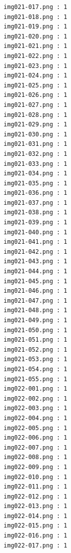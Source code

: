 \documentclass[12pt,a4paper]{article}
\begin{document}
\begin{lstlisting}
                     img021-017.png : 1
                     img021-018.png : 1
                     img021-019.png : 1
                     img021-020.png : 1
                     img021-021.png : 1
                     img021-022.png : 1
                     img021-023.png : 1
                     img021-024.png : 1
                     img021-025.png : 1
                     img021-026.png : 1
                     img021-027.png : 1
                     img021-028.png : 1
                     img021-029.png : 1
                     img021-030.png : 1
                     img021-031.png : 1
                     img021-032.png : 1
                     img021-033.png : 1
                     img021-034.png : 1
                     img021-035.png : 1
                     img021-036.png : 1
                     img021-037.png : 1
                     img021-038.png : 1
                     img021-039.png : 1
                     img021-040.png : 1
                     img021-041.png : 1
                     img021-042.png : 1
                     img021-043.png : 1
                     img021-044.png : 1
                     img021-045.png : 1
                     img021-046.png : 1
                     img021-047.png : 1
                     img021-048.png : 1
                     img021-049.png : 1
                     img021-050.png : 1
                     img021-051.png : 1
                     img021-052.png : 1
                     img021-053.png : 1
                     img021-054.png : 1
                     img021-055.png : 1
                     img022-001.png : 1
                     img022-002.png : 1
                     img022-003.png : 1
                     img022-004.png : 1
                     img022-005.png : 1
                     img022-006.png : 1
                     img022-007.png : 1
                     img022-008.png : 1
                     img022-009.png : 1
                     img022-010.png : 1
                     img022-011.png : 1
                     img022-012.png : 1
                     img022-013.png : 1
                     img022-014.png : 1
                     img022-015.png : 1
                     img022-016.png : 1
                     img022-017.png : 1




\end{lstlisting}
\end{document}
